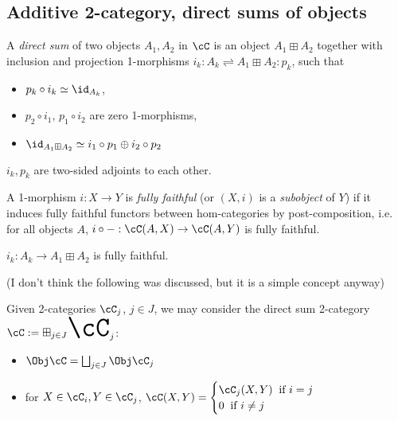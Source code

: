 \documentclass[12pt]{article}
\newcommand{\bigboxplus}{\Huge \boxplus}
\begin{document}
\subsection{Additive 2-category, direct sums of objects}

\begin{definition}
A \emph{direct sum} of two objects $A_1,A_2$ in $\cC$
is an object $A_1 \boxplus A_2$ together with
inclusion and projection 1-morphisms
$i_k : A_k \rightleftharpoons A_1 \boxplus A_2 : p_k$,
such that
\begin{itemize}
\item $p_k \circ i_k \simeq \id_{A_k}$,
\item $p_2 \circ i_1$, $p_1 \circ i_2$ are zero 1-morphisms,
\item $\id_{A_1 \boxplus A_2} \simeq
	i_1 \circ p_1 \oplus i_2 \circ p_2$
\end{itemize}
\end{definition}

\begin{proposition}
$i_k,p_k$ are two-sided adjoints to each other.
\end{proposition}


\begin{definition}
A 1-morphism $i: X \to Y$ is \emph{fully faithful}
(or $(X,i)$ is a \emph{subobject} of $Y$)
if it induces fully faithful functors between hom-categories
by post-composition, i.e. for all objects $A$,
$i \circ - : \cC(A,X) \to \cC(A,Y)$
is fully faithful.
\end{definition}

\begin{proposition}
$i_k: A_k \to A_1 \boxplus A_2$ is fully faithful.
\end{proposition}



(I don't think the following was discussed,
but it is a simple concept anyway)

\begin{definition}
Given 2-categories $\cC_j$, $j \in J$,
we may consider the direct sum 2-category
$\cC := \bigboxplus_{j \in J} \cC_j$:
\begin{itemize}
\item $\Obj \cC = \bigsqcup_{j \in J} \Obj \cC_j$

\item for $X \in \cC_i, Y \in \cC_j$,
	$\cC(X,Y) =
\begin{cases}
	\cC_j(X,Y) \;\; \text{if } i = j
	\\
	0 \;\; \text{if } i \neq j
\end{cases}
$
\end{itemize}
\end{definition}
\end{document}
